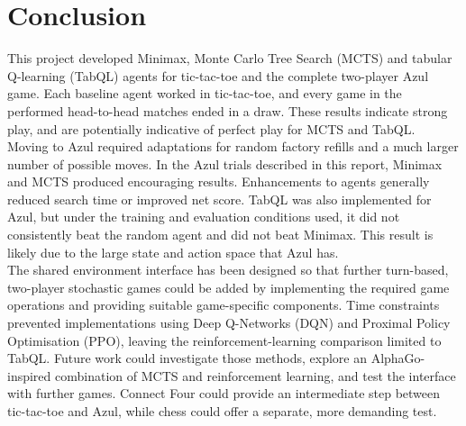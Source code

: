 \section{Conclusion}
This project developed Minimax, Monte Carlo Tree Search (MCTS) and tabular Q-learning (TabQL) agents for tic-tac-toe and the complete two-player Azul game. Each baseline agent worked in tic-tac-toe, and every game in the performed head-to-head matches ended in a draw. These results indicate strong play, and are potentially indicative of perfect play for MCTS and TabQL.\\

Moving to Azul required adaptations for random factory refills and a much larger number of possible moves. In the Azul trials described in this report, Minimax and MCTS produced encouraging results. Enhancements to agents generally reduced search time or improved net score. TabQL was also implemented for Azul, but under the training and evaluation conditions used, it did not consistently beat the random agent and did not beat Minimax. This result is likely due to the large state and action space that Azul has.\\

The shared environment interface has been designed so that further turn-based, two-player stochastic games could be added by implementing the required game operations and providing suitable game-specific components. Time constraints prevented implementations using Deep Q-Networks (DQN) and Proximal Policy Optimisation (PPO), leaving the reinforcement-learning comparison limited to TabQL. Future work could investigate those methods, explore an AlphaGo-inspired\cite{alphagozero} combination of MCTS and reinforcement learning, and test the interface with further games. Connect Four could provide an intermediate step between tic-tac-toe and Azul, while chess could offer a separate, more demanding test.